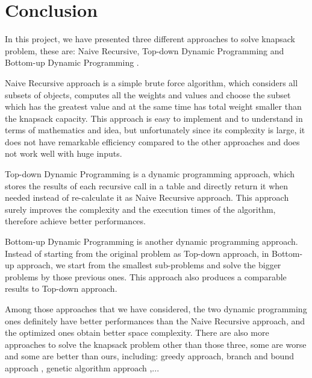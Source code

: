 \documentclass{article}
\begin{document}
\section{Conclusion}
In this project, we have presented three different approaches to solve knapsack problem, these are: Naive Recursive, Top-down Dynamic Programming \cite{greedy} and Bottom-up Dynamic Programming \cite{budp}.

Naive Recursive approach is a simple brute force algorithm, which considers all subsets of objects, computes all the weights and values and choose the subset which has the greatest value and at the same time has total weight smaller than the knapsack capacity. This approach is easy to implement and to understand in terms of mathematics and idea, but unfortunately since its complexity is large, it does not have remarkable efficiency compared to the other approaches and does not work well with huge inputs.

Top-down Dynamic Programming is a dynamic programming approach, which stores the results of each recursive call in a table and directly return it when needed instead of re-calculate it as Naive Recursive approach. This approach surely improves the complexity and the execution times of the algorithm, therefore achieve better performances.

Bottom-up Dynamic Programming is another dynamic programming approach. Instead of starting from the original problem as Top-down approach, in Bottom-up approach, we start from the smallest sub-problems and solve the bigger problems by those previous ones. This approach also produces a comparable results to Top-down approach.

Among those approaches that we have considered, the two dynamic programming ones definitely have better performances than the Naive Recursive approach, and the optimized ones obtain better space complexity. There are also more approaches to solve the knapsack problem other than those three, some are worse and some are better than ours, including: greedy approach\cite{greedy}, branch and bound approach \cite{bab}, genetic algorithm approach \cite{ga},... 
\printbibliography[title = {References}]
\end{document}
